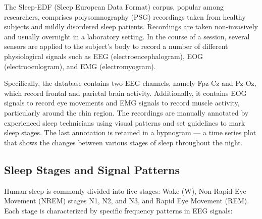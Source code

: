 The Sleep-EDF (Sleep European Data Format) corpus, popular among researchers, comprises polysomnography (PSG) recordings taken from healthy subjects and mildly disordered sleep patients. Recordings are taken non-invasively and usually overnight in a laboratory setting. In the course of a session, several sensors are applied to the subject's body to record a number of different physiological signals such as EEG (electroencephalogram), EOG (electrooculogram), and EMG (electromyogram).

Specifically, the database contains two EEG channels, namely Fpz-Cz and Pz-Oz, which record frontal and parietal brain activity. Additionally, it contains EOG signals to record eye movements and EMG signals to record muscle activity, particularly around the chin region. The recordings are manually annotated by experienced sleep technicians using visual patterns and set guidelines to mark sleep stages. The last annotation is retained in a hypnogram — a time series plot that shows the changes between various stages of sleep throughout the night.

\subsection{Sleep Stages and Signal Patterns}

Human sleep is commonly divided into five stages: Wake (W), Non-Rapid Eye Movement (NREM) stages N1, N2, and N3, and Rapid Eye Movement (REM). Each stage is characterized by specific frequency patterns in EEG signals:

\begin{table}[H]
	\centering
	\caption{Brainwave Types and Their Characteristics in Sleep Staging}
	\label{tab:brainwaves}
\end{table}




